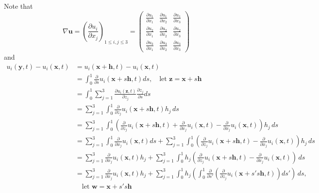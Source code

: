 Note that
\begin{equation}
\nabla \textbf{u} = \left(\frac{\partial u_i}{\partial x_j}\right)_{1\leq i,j\leq 3}
= \begin{pmatrix}
\frac{\partial u_1}{\partial x_1} & \frac{\partial u_1}{\partial x_2} & \frac{\partial u_1}{\partial x_3}\\
\frac{\partial u_2}{\partial x_1} & \frac{\partial u_2}{\partial x_2} & \frac{\partial u_2}{\partial x_3}\\
\frac{\partial u_3}{\partial x_1} & \frac{\partial u_3}{\partial x_2} & \frac{\partial u_3}{\partial x_3}
\end{pmatrix}
\end{equation}
and 
\begin{equation}
\begin{aligned}
u_i(\textbf{y},t) - u_i(\textbf{x},t)
&= u_i(\textbf{x}+\textbf{h},t) - u_i(\textbf{x},t)\\
&= \int_{0}^{1}\frac{\partial}{\partial s} u_i(\textbf{x}+s\textbf{h},t)ds,
\quad\text{let $\textbf{z}=\textbf{x}+s\textbf{h}$}\\
&=  \int_{0}^{1} \sum_{j=1}^{3} \frac{\partial u_i(\textbf{z},t)}{\partial z_j}\frac{\partial z_j}{\partial s}ds\\
&= \sum_{j=1}^{3} \int_{0}^{1} \frac{\partial}{\partial z_j}u_i(\textbf{x}+s\textbf{h},t)h_j\,ds\\
&= \sum_{j=1}^{3}\int_{0}^{1} \left(\frac{\partial}{\partial z_j}u_i(\textbf{x}+s\textbf{h},t) + \frac{\partial}{\partial x_j}u_i(\textbf{x},t) - \frac{\partial}{\partial x_j}u_i(\textbf{x},t)\right)h_j\,ds\\
&= \sum_{j=1}^{3}\int_{0}^{1}\frac{\partial}{\partial x_j}u_i(\textbf{x},t)ds + \sum_{j=1}^{3}\int_{0}^{1} \left(\frac{\partial}{\partial z_j}u_i(\textbf{x}+s\textbf{h},t)  - \frac{\partial}{\partial x_j}u_i(\textbf{x},t)\right)h_j\,ds\\
&= \sum_{j=1}^{3}\frac{\partial}{\partial x_j}u_i(\textbf{x},t) h_j
+ \sum_{j=1}^{3}\int_{0}^{1} h_j \left(\frac{\partial}{\partial z_j}u_i(\textbf{x}+s\textbf{h},t)  - \frac{\partial}{\partial x_j}u_i(\textbf{x},t)\right)\,ds\\
&= \sum_{j=1}^{3}\frac{\partial}{\partial x_j}u_i(\textbf{x},t) h_j
+ \sum_{j=1}^{3}\int_{0}^{1} h_j \left(\int_{0}^{1}\frac{\partial}{\partial s'}
\left(\frac{\partial}{\partial z_j}u_i(\textbf{x}+s's\textbf{h},t)\right) ds'\right)\,ds,\\[6pt]
&\quad\text{let $\textbf{w}=\textbf{x}+s's\textbf{h}$}\\

\end{aligned}
\end{equation}

